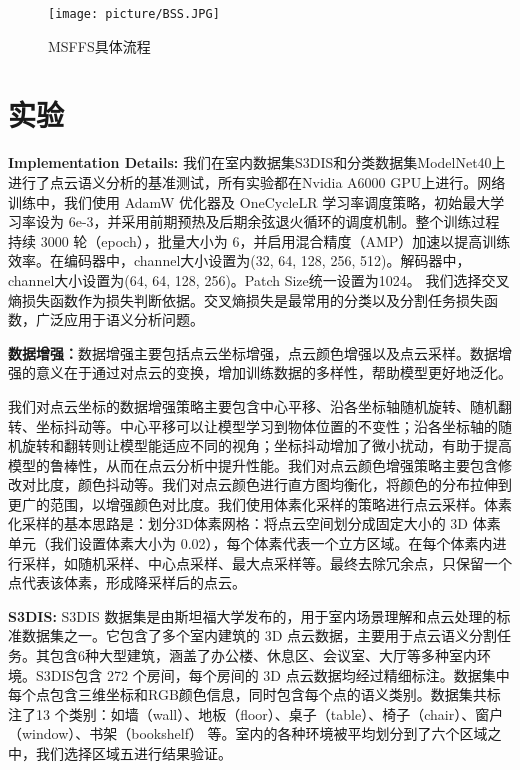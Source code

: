 \documentclass[preprint,12pt]{elsarticle}
\begin{document}
\begin{figure}[htbp]
	\centering
	\texttt{[image: picture/BSS.JPG]}
	\caption{MSFFS具体流程}
	\label{fig:bss}
\end{figure}







\section{实验}
\textbf{Implementation Details:}
我们在室内数据集S3DIS和分类数据集ModelNet40上进行了点云语义分析的基准测试，所有实验都在Nvidia A6000 GPU上进行。网络训练中，我们使用 AdamW 优化器及 OneCycleLR 学习率调度策略，初始最大学习率设为 6e-3，并采用前期预热及后期余弦退火循环的调度机制。整个训练过程持续 3000 轮（epoch），批量大小为 6，并启用混合精度（AMP）加速以提高训练效率。在编码器中，channel大小设置为(32, 64, 128, 256, 512)。解码器中，channel大小设置为(64, 64, 128, 256)。Patch Size统一设置为1024。
我们选择交叉熵损失函数作为损失判断依据。交叉熵损失是最常用的分类以及分割任务损失函数，广泛应用于语义分析问题。

\textbf{数据增强：}数据增强主要包括点云坐标增强，点云颜色增强以及点云采样。数据增强的意义在于通过对点云的变换，增加训练数据的多样性，帮助模型更好地泛化。

我们对点云坐标的数据增强策略主要包含中心平移、沿各坐标轴随机旋转、随机翻转、坐标抖动等。中心平移可以让模型学习到物体位置的不变性；沿各坐标轴的随机旋转和翻转则让模型能适应不同的视角；坐标抖动增加了微小扰动，有助于提高模型的鲁棒性，从而在点云分析中提升性能。我们对点云颜色增强策略主要包含修改对比度，颜色抖动等。我们对点云颜色进行直方图均衡化，将颜色的分布拉伸到更广的范围，以增强颜色对比度。我们使用体素化采样的策略进行点云采样。体素化采样的基本思路是：划分3D体素网格：将点云空间划分成固定大小的 3D 体素单元（我们设置体素大小为 0.02），每个体素代表一个立方区域。在每个体素内进行采样，如随机采样、中心点采样、最大点采样等。最终去除冗余点，只保留一个点代表该体素，形成降采样后的点云。



\textbf{S3DIS:}
S3DIS 数据集是由斯坦福大学发布的，用于室内场景理解和点云处理的标准数据集之一。它包含了多个室内建筑的 3D 点云数据，主要用于点云语义分割任务。其包含6种大型建筑，涵盖了办公楼、休息区、会议室、大厅等多种室内环境。S3DIS包含 272 个房间，每个房间的 3D 点云数据均经过精细标注。数据集中每个点包含三维坐标和RGB颜色信息，同时包含每个点的语义类别。数据集共标注了13 个类别：如墙（wall）、地板（floor）、桌子（table）、椅子（chair）、窗户（window）、书架（bookshelf） 等。室内的各种环境被平均划分到了六个区域之中，我们选择区域五进行结果验证。
\end{document}
